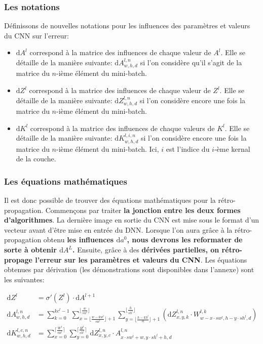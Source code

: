 \documentclass[12pt,a4paper]{extarticle}
\newcommand{\ud}{\mathrm{d}}
\begin{document}
\subsubsection{Les notations}
Définissons de nouvelles notations pour les influences des paramètres et valeurs du CNN sur l'erreur:
\begin{itemize}
\item $\ud A^l$ correspond à la matrice des influences de chaque valeur de $A^l$. Elle se détaille de la manière suivante: $\ud A^{l,n}_{w,h,d}$ si l'on considère qu'il s'agit de la matrice du $n$-ième élément du mini-batch.
\item $\ud Z^l$ correspond à la matrice des influences de chaque valeur de $Z^l$. Elle se détaille de la manière suivante: $\ud Z^{l,n}_{w,h,d}$ si l'on considère encore une fois la matrice du $n$-ième élément du mini-batch.
\item $\ud K^l$ correspond à la matrice des influences de chaque valeurs de $K^l$. Elle se détaille de la manière suivante: $\ud K^{l,i,n}_{w,h,d}$ si l'on considère encore une fois la matrice du $n$-ième élément du mini-batch. Ici, $i$ est l'indice du $i$-ème kernal de la couche.
\end{itemize}

\subsubsection{Les équations mathématiques}
Il est donc possible de trouver des équations mathématiques pour la rétro-propagation. Commençons par traiter \textbf{la jonction entre les deux formes d'algorithmes}. La dernière image en sortie du CNN est mise sous le format d'un vecteur avant d'être mise en entrée du DNN. Lorsque l'on aura grâce à la rétro-propagation obtenu \textbf{les influences $\ud a^0$, nous devrons les reformater de sorte à obtenir $\ud A^L$.} Ensuite, grâce à des \textbf{dérivées partielles, on rétro-propage l'erreur sur les paramètres et valeurs du CNN}. Les équations obtenues par dérivation (les démonstrations sont disponibles dans l'annexe) sont les suivantes:

\begin{align}
\ud Z^l &= \sigma '(Z^l) \cdot \ud A^{l+1} \\
\ud A^{l,n}_{w,h,d} &=  \sum_{k=0}^{kc^l-1}\sum_{x=\lfloor\frac{w-kw^l}{sw^l} \rfloor+1}^{\lfloor \frac{w}{sw^l} \rfloor}\sum_{y=\lfloor\frac{h-kh^l}{sl} \rfloor+1}^{\lfloor \frac{h}{sh^l} \rfloor}(\ud Z^{l,n}_{x,y,k}\cdot W^{l,k}_{w-x\cdot sw^l, h - y\cdot sh^l, d}) \\
\ud K^{l,c,n}_{w,h,d} &= \sum_{x=0}^{ \lceil \frac{W^l}{sw^l} \rceil} \sum_{y=0}^{\lceil \frac{H^l}{sh^l}\rceil }\ud Z^{l,n}_{x,y,c}\cdot A^{l,n}_{x\cdot sw^l+w, y\cdot sh^l+h, d}
\end{align}
\end{document}
